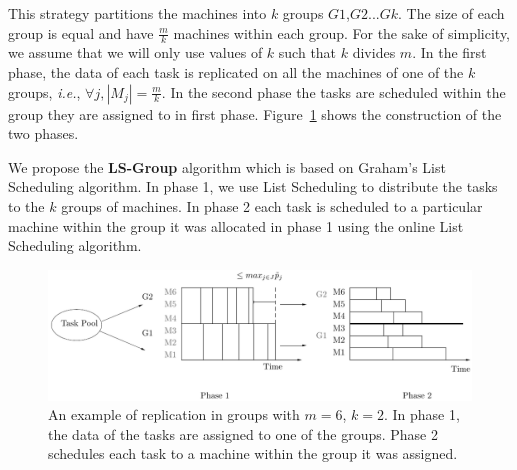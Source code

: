 \documentclass[10pt, conference, compsocconf]{IEEEtran}
\begin{document}
This strategy partitions the machines into $k$ groups
$G1$,$G2$...$Gk$. The size of each group is equal and have
$\frac{m}{k}$ machines within each group. For the sake of
simplicity, we assume that we will only use values of $k$ such that
$k$ divides $m$. In the first phase, the data of each task is
replicated on all the machines of one of the $k$ groups,
{\em i.e.}, $\forall j, |M_j|= \frac{m}{k}$. In the second phase the tasks
are scheduled within the group they are assigned to in first phase.
Figure~\ref{fig:Model 3} shows the construction of the two phases.

We propose the \textbf{LS-Group} algorithm which is based on Graham's
List Scheduling algorithm. In phase 1, we use List Scheduling to
distribute the tasks to the $k$ groups of machines. In phase 2 each
task is scheduled to a particular machine within the group it was
allocated in phase 1 using the online List Scheduling algorithm.

\begin{figure}[htp] 
\centering
\includegraphics[width=\linewidth]{model3.pdf}
\caption{An example of replication in groups with $m = 6$, $k = 2$. In
  phase 1, the data of the tasks are assigned to one of the
  groups. Phase 2 schedules each task to a machine within the group it was 
  assigned.}
\label{fig:Model 3}
\end{figure}
\end{document}
